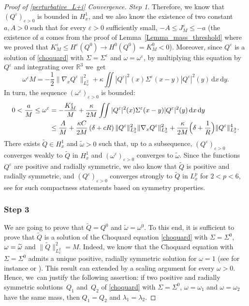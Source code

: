 \documentclass[JEP,XML,SOM,NoEqCountersInSection,NoFloatCountersInSection,Unicode,published]{cedram}
\theoremstyle{definition}
\newenvironment{ProofOf}[1]{\begin{proof}[Proof of #1]}{\end{proof}}
\newcommand{\R}{\mathbb{R}}
\newcommand{\ud}{\, {\mathrm{d}}}
\begin{document}
\begin{ProofOf}{\eqref{perturbative_L+i} Convergence. Step 1}
Therefore, we know that $(Q^{\varepsilon})_{\varepsilon>0}$ is bounded in $H_{x}^{1}$, and we also know the existence of two constant $a,A>0$ such that for every $\varepsilon>0$ sufficiently small, \hbox{$-A\leq J_{M}^{\varepsilon}\leq -a$} (the existence of $a$ comes from the proof of Lemma~\ref{Lemma_mass_threshold} where we proved that \hbox{$K_{M}^{\varepsilon}\leq H^{\varepsilon}(Q^{0})\to H^{0}(Q^{0})=K_{M}^{0}<0$}). Moreover, since $Q^{\varepsilon}$ is a solution of \eqref{choquard} with $\Sigma=\Sigma^{\varepsilon}$ and $\omega=\omega^{\varepsilon}$, by multiplying this equation by $Q^{\varepsilon}$ and integrating over $\R^{3}$ we~get
\[
\omega^{\varepsilon}M=-\frac{1}{2}\|\nabla_{x}Q^{\varepsilon}\|_{L_{x}^{2}}^{2}+\kappa\iint|Q^{\varepsilon}|^{2}(x)\Sigma^{\varepsilon}(x-y)|Q^{\varepsilon}|^{2}(y)\ud x\ud y.
\]
In turn, the sequence $(\omega^{\varepsilon})_{\varepsilon>0}$ is bounded:
\begin{align*}
0<\frac{a}{M}\leq\omega^{\varepsilon}&=-\frac{K_{M}^{\varepsilon}}{M}+\frac{\kappa}{2M}\iint|Q^{\varepsilon}|^{2}(x)\Sigma^{\varepsilon}(x-y)|Q^{\varepsilon}|^{2}(y)\ud x\ud y\\
&\leq\frac{A}{M}+\frac{\kappa C}{2M}\left(\delta+cR\right)\|Q^{\varepsilon}\|_{L_{x}^{2}}^{2}\|\nabla_{x}Q^{\varepsilon}\|_{L_{x}^{2}}^{2}+\frac{\kappa}{2M}\Bigl(\delta+\frac{1}{R} \Bigr)\|Q^{\varepsilon}\|_{L_{x}^{2}}^{4}.
\end{align*}
There exists $\widetilde{Q}\in H_{x}^{1}$ and $\widetilde{\omega}>0$ such that, up to a subsequence, $(Q^{\varepsilon})_{\varepsilon>0}$ converges weakly to $\widetilde{Q}$ in $H_{x}^{1}$ and $(\omega^{\varepsilon})_{\varepsilon>0}$ converges to $\widetilde{\omega}$. Since the functions $Q^{\varepsilon}$ are positive and radially symmetric,
we also know that $\widetilde{Q}$ is positive and radially symmetric, and $(Q^{\varepsilon})_{\varepsilon>0}$ converges strongly to $\widetilde{Q}$ in $L_{x}^{p}$ for $2<p<6$,
see \cite{Pllsc,Strauss} for such compactness statements based on symmetry properties.

\subsubsection*{Step 3} We are going to prove that $\widetilde{Q}=Q^{0}$ and $\widetilde{\omega}=\omega^{0}$. To this end, it is sufficient to prove that $\widetilde{Q}$ is a solution of the Choquard equation \eqref{choquard} with $\Sigma=\Sigma^{0}$, $\omega=\nobreak\widetilde{\omega}$ and $\|\widetilde{Q}\|_{L_{x}^{2}}^{2}=M$. Indeed, we know that the Choquard equation with $\Sigma=\Sigma^{0}$ admits a unique positive, radially symmetric solution for $\omega=1$ (see for instance \cite{Lieb_Choquard} or \cite[App.\,A]{Lenzmann}).
This result can extended by a scaling argument for every $\omega>0$.
Hence, we~can justify the following assertion: if two positive and radially symmetric solutions~$Q_{1}$ and~$Q_{2}$ of \eqref{choquard} with $\Sigma=\Sigma^{0}$, $\omega=\omega_{1}$ and $\omega=\omega_{2}$ have the same mass, then $Q_{1}=Q_{2}$ and $\lambda_{1}=\lambda_{2}$.


\end{ProofOf}
\end{document}
